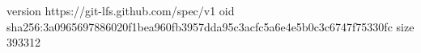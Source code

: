 version https://git-lfs.github.com/spec/v1
oid sha256:3a0965697886020f1bea960fb3957dda95c3acfc5a6e4e5b0c3c6747f75330fc
size 393312
